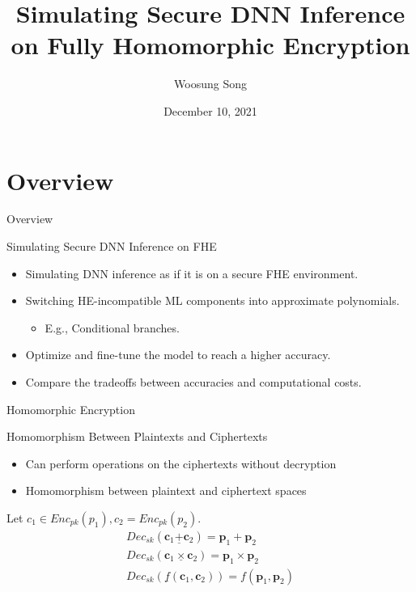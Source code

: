 \documentclass[9pt]{beamer}
\author[lego0901@gmail.com]{Woosung Song}
\title{Simulating Secure DNN Inference on Fully Homomorphic Encryption}
\institute{Seoul National University, Dept. of Computer Science and Engineering}
\date{December 10, 2021}
\renewcommand{\vec}{\mathbf}
\begin{document}
\frame{\titlepage}

\section{Overview}

\begin{frame}{Overview}
    \begin{block}{Simulating Secure DNN Inference on FHE}
        \begin{itemize}
            \item Simulating DNN inference as if it is on a secure FHE environment.
            \item Switching HE-incompatible ML components into approximate polynomials.
                  \begin{itemize}
                      \item E.g., Conditional branches.
                  \end{itemize}
            \item Optimize and fine-tune the model to reach a higher accuracy.
            \item Compare the tradeoffs between accuracies and computational costs.
        \end{itemize}
    \end{block}
\end{frame}

\begin{frame}{Homomorphic Encryption}
    \begin{block}{Homomorphism Between Plaintexts and Ciphertexts}
        \begin{itemize}
            \item \alert{Can perform operations on the ciphertexts without decryption}
            \item Homomorphism between plaintext and ciphertext spaces
        \end{itemize}
    \end{block}
    \medskip
    Let $c_1 \in Enc_{pk}(p_1), c_2 = Enc_{pk}(p_2)$.
    \begin{gather*}
        Dec_{sk}(\vec c_1 \underline{+} \vec c_2) = \vec p_1 + \vec p_2 \\
        Dec_{sk}(\vec c_1 \underline{\times} \vec c_2) = \vec p_1 \times \vec p_2 \\
        Dec_{sk}(\underline{f}(\vec c_1, \vec c_2)) = f(\vec p_1, \vec p_2)
    \end{gather*}
\end{frame}
\end{document}
